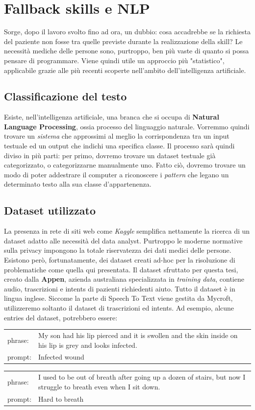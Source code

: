 \chapter{Fallback skills e NLP}
\label{chap:fallback}
Sorge, dopo il lavoro svolto fino ad ora, un dubbio: cosa accadrebbe se la richiesta del paziente non fosse tra quelle previste durante la realizzazione della skill?
Le necessità mediche delle persone sono, purtroppo, ben più vaste di quanto si possa pensare di programmare. Viene quindi utile un approccio più "statistico", applicabile grazie alle più recenti scoperte nell'ambito dell'intelligenza artificiale.
\section{Classificazione del testo}
Esiste, nell'intelligenza artificiale, una branca che si occupa di \textbf{Natural Language Processing}, ossia processo del linguaggio naturale. Vorremmo quindi trovare un \textit{sistema} che approssimi al meglio la corrispondenza tra un input testuale ed un output che indichi una specifica classe. Il processo sarà quindi diviso in più parti: per primo, dovremo trovare un dataset testuale già categorizzato, o categorizzarne manualmente uno. Fatto ciò, dovremo trovare un modo di poter addestrare il computer a riconoscere i \textit{pattern} che legano un determinato testo alla sua classe d'appartenenza.
\section{Dataset utilizzato}
La presenza in rete di siti web come \textit{Kaggle} semplifica nettamente la ricerca di un dataset adatto alle necessità del data analyst. Purtroppo le moderne normative sulla privacy impongono la totale riservatezza dei dati medici delle persone. Esistono però, fortunatamente, dei dataset creati ad-hoc per la risoluzione di problematiche come quella qui presentata. Il dataset sfruttato per questa tesi, creato dalla \textbf{Appen}, azienda australiana specializzata in \textit{training data}, contiene audio, trascrizioni e intents di pazienti richiedenti aiuto. Tutto il dataset è in lingua inglese. Siccome la parte di Speech To Text viene gestita da Mycroft, utilizzeremo soltanto il dataset di trascrizioni ed intents. Ad esempio, alcune entries del dataset, potrebbero essere:
\begin{table}[H]
    \begin{tabularx}{\textwidth}{|l|X|}
        phrase: & My son had his lip pierced and it is swollen and the skin inside on his lip is grey and looks infected.
        \\
        prompt: & Infected wound
    \end{tabularx}
\end{table}
\begin{table}[H]
    \begin{tabularx}{\textwidth}{|l|X|}
        phrase: & I used to be out of breath after going up a dozen of stairs, but now I struggle to breath even when I sit down.
        \\
        prompt: & Hard to breath
    \end{tabularx}
\end{table}
